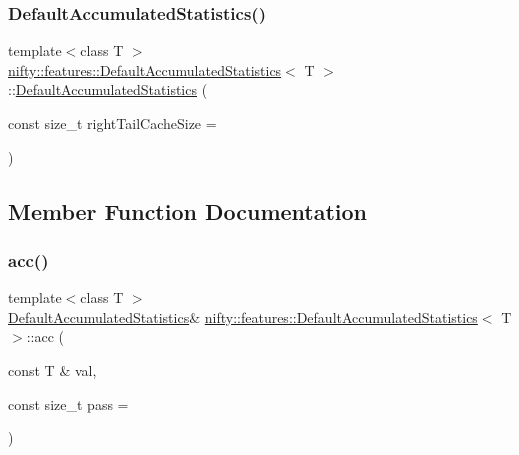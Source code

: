 \subsubsection{\texorpdfstring{Default\+Accumulated\+Statistics()}{DefaultAccumulatedStatistics()}}
{\footnotesize\ttfamily template$<$class T $>$ \\
\hyperlink{classnifty_1_1features_1_1DefaultAccumulatedStatistics}{nifty\+::features\+::\+Default\+Accumulated\+Statistics}$<$ T $>$\+::\hyperlink{classnifty_1_1features_1_1DefaultAccumulatedStatistics}{Default\+Accumulated\+Statistics} (\begin{DoxyParamCaption}\item[{const size\+\_\+t}]{right\+Tail\+Cache\+Size = {} }\end{DoxyParamCaption})\hspace{0.3cm}{\ttfamily [inline]}}



\subsection{Member Function Documentation}
\mbox{\label{classnifty_1_1features_1_1DefaultAccumulatedStatistics_a3cddf901950504afb3eacb8f2277c572}} 
\subsubsection{\texorpdfstring{acc()}{acc()}}
{\footnotesize\ttfamily template$<$class T $>$ \\
\hyperlink{classnifty_1_1features_1_1DefaultAccumulatedStatistics}{Default\+Accumulated\+Statistics}\& \hyperlink{classnifty_1_1features_1_1DefaultAccumulatedStatistics}{nifty\+::features\+::\+Default\+Accumulated\+Statistics}$<$ T $>$\+::acc (\begin{DoxyParamCaption}\item[{const T \&}]{val,  }\item[{const size\+\_\+t}]{pass = {} }\end{DoxyParamCaption})\hspace{0.3cm}{\ttfamily [inline]}}

